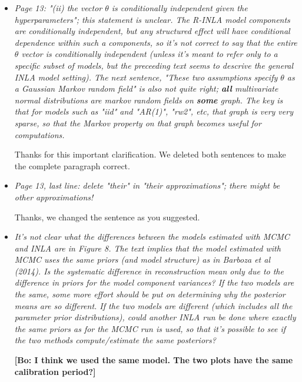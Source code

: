 \documentclass[11pt]{article}
\newcommand{\bl}[1]{\color{red}\textbf{[Bo: #1]}\normalcolor}
\begin{document}
\begin{itemize}
\item \textit{Page 13: "(ii) the vector $\theta$ is conditionally independent given
  the hyperparameters"; this statement is unclear. The R-INLA model
  components are conditionally independent, but any structured effect
  will have conditional dependence within such a components, so it's
  not correct to say that the entire $\theta$ vector is conditionally
  independent (unless it's meant to refer only to a specific subset of
  models, but the preceeding text seems to descrive the general INLA
  model setting). The next sentence, "These two assumptions specify $\theta$ as a
  Gaussian Markov random field" is also not quite right; \textbf{all}
  multivariate normal distributions are markov random fields on \textbf{some}
  graph. The key is that for models such as "iid" and "AR(1)", "rw2",
  etc, that graph is very very sparse, so that the Markov property on
  that graph becomes useful for computations.} 

Thanks for this important clarification. We deleted both sentences to make the complete
paragraph correct. 


\item \textit{Page 13, last line: delete "their" in "their approximations"; there
  might be other approximations!}
  
Thanks, we changed the sentence as you suggested.

\item \textit{It's not clear what the differences between the models estimated
  with MCMC and INLA are in Figure 8. The text implies that the model
  estimated with MCMC uses the same priors (and model structure) as in
  Barboza et al (2014). Is the systematic difference in reconstruction
  mean only due to the difference in priors for the model component
  variances?  If the two models are the same, some more effort should
  be put on determining why the posterior means are so different. If
  the two models are different (which includes all the parameter prior
  distributions), could another INLA run be done where exactly the
  same priors as for the MCMC run is used, so that it's possible to
  see if the two methods compute/estimate the same posteriors?}

\bl{I think we used the same model. The two plots have the same calibration period?}


\end{itemize}
\end{document}
